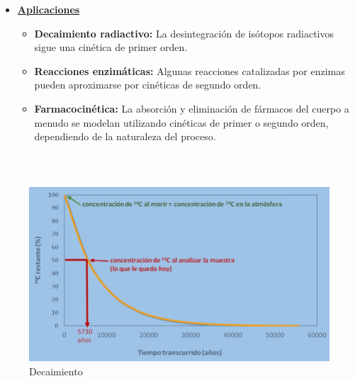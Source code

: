 \documentclass[
  10pt,
  ignorenonframetext,
  aspectratio=169,
]{beamer}
\providecommand{\tightlist}{%
  \setlength{\itemsep}{0pt}\setlength{\parskip}{0pt}}
\begin{document}
\begin{frame}
\begin{itemize}
\item
  \ul{\textbf{Aplicaciones}}

  \begin{itemize}
  \tightlist
  \item
    \textbf{Decaimiento radiactivo:} La desintegración de isótopos
    radiactivos sigue una cinética de primer orden.
  \item
    \textbf{Reacciones enzimáticas:} Algunas reacciones catalizadas por
    enzimas pueden aproximarse por cinéticas de segundo orden.
  \item
    \textbf{Farmacocinética:} La absorción y eliminación de fármacos del
    cuerpo a menudo se modelan utilizando cinéticas de primer o segundo
    orden, dependiendo de la naturaleza del proceso.
  \end{itemize}
\end{itemize}

\(~\)

\begin{columns}[T]
\begin{column}{0.48\textwidth}
\begin{figure}
\centering
\includegraphics[width=\textwidth,height=0.35\textheight]{./images/grafico.jpg}
\caption{Decaimiento}
\end{figure}
\end{column}


\end{columns}
\end{frame}
\end{document}
